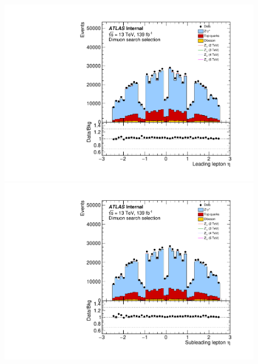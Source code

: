 \begin{figure}[h!]
\captionsetup[subfigure]{position=b}
\centering
\begin{minipage}[b]{.45\linewidth}
    \includegraphics[width=1\textwidth]{figures/ci/dataMc/stacks_mc16e_2015-2018_uu_eta1.pdf}
    \subcaption{}
\end{minipage} 
\begin{minipage}[b]{.45\linewidth}
    \includegraphics[width=1\textwidth]{figures/ci/dataMc/stacks_mc16e_2015-2018_uu_eta2.pdf}
    \subcaption{}
\end{minipage}\\
\begin{minipage}[b]{.45\linewidth}

\end{minipage}
\end{figure}
